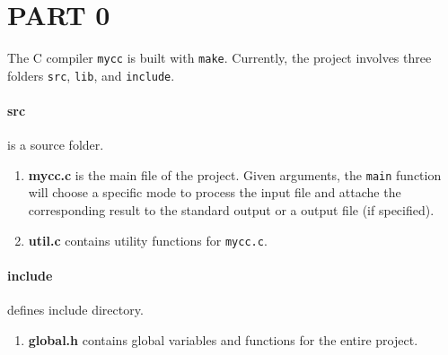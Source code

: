 \section*{PART 0}

The C compiler \texttt{mycc} is built with \texttt{make}.
Currently, the project involves three folders 
\texttt{src}, \texttt{lib}, and \texttt{include}.

\paragraph{\large\textbf{src}} is a source folder.
\begin{enumerate}
    \item \textbf{mycc.c} is the main file of the project. Given arguments, the \texttt{main} function will choose a specific mode to process the input file and attache the corresponding result to the standard output or a output file (if specified).
    \item \textbf{util.c} contains utility functions for \texttt{mycc.c}.
\end{enumerate}

\paragraph{\large\textbf{include}} defines include directory.
\begin{enumerate}
    \item \textbf{global.h} contains global variables and functions for the entire project.
\end{enumerate} 

